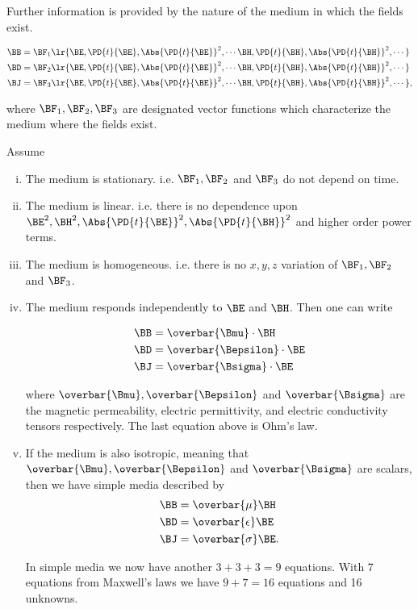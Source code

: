 Further information is provided by the nature of the medium in which the fields exist.

\begin{equation}\label{eqn:uwavesLecture1:720}
\begin{aligned}
\BB &= \BF_1\lr{ \BE, \PD{t}{\BE}, \Abs{\PD{t}{\BE}}^2, \cdots \BH, \PD{t}{\BH}, \Abs{\PD{t}{\BH}}^2, \cdots } \\
\BD &= \BF_2\lr{ \BE, \PD{t}{\BE}, \Abs{\PD{t}{\BE}}^2, \cdots \BH, \PD{t}{\BH}, \Abs{\PD{t}{\BH}}^2, \cdots } \\
\BJ &= \BF_3\lr{ \BE, \PD{t}{\BE}, \Abs{\PD{t}{\BE}}^2, \cdots \BH, \PD{t}{\BH}, \Abs{\PD{t}{\BH}}^2, \cdots },
\end{aligned}
\end{equation}

where \( \BF_1, \BF_2, \BF_3 \) are designated vector functions which characterize the medium where the fields exist.

Assume

\begin{enumerate}[(i)]
\item The medium is stationary.  i.e. \( \BF_1, \BF_2 \) and \( \BF_3 \) do not depend on time.
\item The medium is linear.  i.e. there is no dependence upon \( \BE^2, \BH^2, \Abs{\PD{t}{\BE}}^2, \Abs{\PD{t}{\BH}}^2 \) and higher order power terms.
\item The medium is homogeneous.  i.e. there is no \( x, y, z\) variation of \( \BF_1, \BF_2 \) and \( \BF_3 \).
\item The medium responds independently to \( \BE \) and \( \BH \).  Then one can write

\begin{equation}\label{eqn:uwavesLecture1:740}
\begin{aligned}
\BB &= \overbar{\Bmu} \cdot \BH \\
\BD &= \overbar{\Bepsilon} \cdot \BE \\
\BJ &= \overbar{\Bsigma} \cdot \BE
\end{aligned}
\end{equation}

where \( \overbar{\Bmu}, \overbar{\Bepsilon} \) and \( \overbar{\Bsigma} \) are the magnetic permeability, electric permittivity, and electric conductivity tensors respectively.  The last equation above is Ohm's law.
\item If the medium is also isotropic, meaning that \( \overbar{\Bmu}, \overbar{\Bepsilon} \) and \( \overbar{\Bsigma} \) are scalars, then we have simple media described by
\begin{equation}\label{eqn:uwavesLecture1:760}
\begin{aligned}
\BB &= \overbar{\mu}  \BH \\
\BD &= \overbar{\epsilon}  \BE \\
\BJ &= \overbar{\sigma}  \BE.
\end{aligned}
\end{equation}

In simple media we now have another \( 3 + 3 + 3 = 9 \) equations.  With 7 equations from Maxwell's laws we have \( 9 + 7 = 16 \) equations and 16 unknowns.
\end{enumerate}

